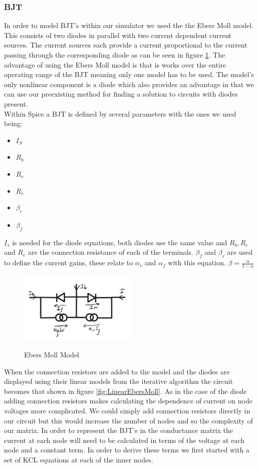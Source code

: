 \documentclass{article}
\begin{document}
\subsubsection{BJT}\label{ssec:BJT}
In order to model BJT's within our simulator we used the the Ebers Moll model\cite{BJTModel}. This consists of two diodes in parallel with two current dependent current sources. The current sources each provide a current proportional to the current passing through the corresponding diode as can be seen in figure \ref{fig:EbersMoll}. The advantage of using the Ebers Moll model is that is works over the entire operating range of the BJT meaning only one model has to be used. The model's only nonlinear component is a diode which also provides an advantage in that we can use our preexisting method for finding a solution to circuits with diodes present. \\
Within Spice a BJT is defined by several parameters with the ones we used being: 
\begin{itemize}
    \item $I_S$
    \item $R_b$
    \item $R_c$
    \item $R_e$
    \item $\beta_r$
    \item $\beta_f$
\end{itemize}
$I_s$ is needed for the diode equations, both diodes use the same value and $R_b, R_c$ and $R_e$ are the connection resistance of each of the terminals. $\beta_f$ and $\beta_r$ are used to define the current gains, these relate to $\alpha_r$ and $\alpha_f$ with this equation. \bigbreak
$\beta = \frac{\alpha}{1-\alpha}$\bigbreak
\begin{figure}[h]
    \caption{Ebers Moll Model}
    \centering
    \includegraphics[width=0.5\textwidth]{images/EbersMoll.png}
    \label{fig:EbersMoll}
\end{figure}
When the connection resistors are added to the model and the diodes are displayed using their linear models from the iterative algorithm the circuit becomes that shown in figure \ref{fig:LinearEbersMoll}. As in the case of the diode adding connection resistors makes calculating the dependence of current on node voltages more complicated. We could simply add connection resistors directly in our circuit but this would increase the number of nodes and so the complexity of our matrix. In order to represent the BJT's in the conductance matrix the current at each node will need to be calculated in terms of the voltage at each node and a constant term. In order to derive these terms we first started with a set of KCL equations at each of the inner nodes. \bigbreak
\end{document}
